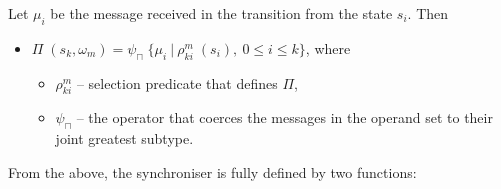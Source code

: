 Let $\mu_{i}$ be the message received in the transition from the state $s_{i}$. Then
  \begin{itemize}
  \item[] $\Pi \; (s_{k}, \omega_{m}) = \psi_{\sqcap} \; \{\mu_{i} \: | \: \rho_{ki}^{m} \; (s_{i}), \: 0 \le i \le k\}$, where
    \begin{itemize}
      \item[] $\rho_{ki}^{m}$ -- selection predicate that defines $\Pi$,
      \item[] $\psi_{\sqcap}$ -- the operator that coerces the messages in the operand set to their joint greatest subtype.
    \end{itemize}
  \end{itemize}

From the above, the synchroniser is fully defined by two functions:

